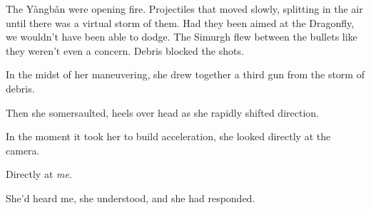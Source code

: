 The Y\`{a}ngb\v{a}n were opening fire.  Projectiles that moved slowly, splitting in the air until there was a virtual storm of them.  Had they been aimed at the Dragonfly, we wouldn't have been able to dodge.  The Simurgh flew between the bullets like they weren't even a concern.  Debris blocked the shots.



In the midst of her maneuvering, she drew together a third gun from the storm of debris.



Then she somersaulted, heels over head as she rapidly shifted direction.



In the moment it took her to build acceleration, she looked directly at the camera.



Directly at \emph{me}.



She'd heard me, she understood, and she had responded.





